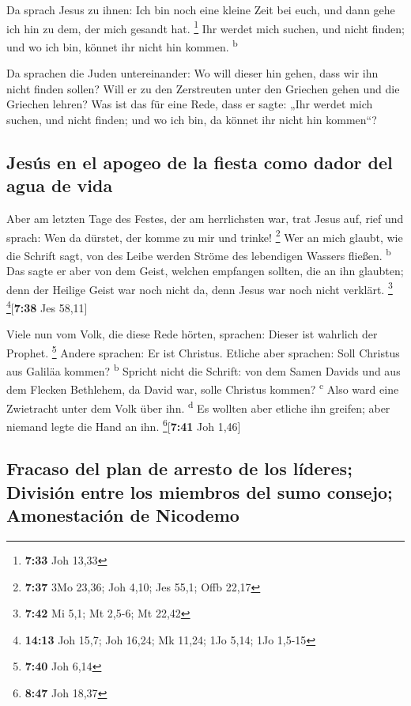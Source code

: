  Da sprach Jesus zu ihnen: Ich bin noch eine kleine Zeit
bei euch, und dann gehe ich hin zu dem, der mich gesandt hat.
\footnote{\textbf{7:33} Joh 13,33}  Ihr werdet mich
suchen, und nicht finden; und wo ich bin, könnet ihr nicht hin kommen.
\textsuperscript{b}

 Da sprachen die Juden untereinander: Wo will dieser hin
gehen, dass wir ihn nicht finden sollen? Will er zu den Zerstreuten
unter den Griechen gehen und die Griechen lehren?  Was
ist das für eine Rede, dass er sagte: „Ihr werdet mich suchen, und nicht
finden; und wo ich bin, da könnet ihr nicht hin kommen``?

\hypertarget{jesuxfas-en-el-apogeo-de-la-fiesta-como-dador-del-agua-de-vida}{%
\subsection{Jesús en el apogeo de la fiesta como dador del agua de
vida}\label{jesuxfas-en-el-apogeo-de-la-fiesta-como-dador-del-agua-de-vida}}

 Aber am letzten Tage des Festes, der am herrlichsten
war, trat Jesus auf, rief und sprach: Wen da dürstet, der komme zu mir
und trinke! \footnote{\textbf{7:37} 3Mo 23,36; Joh 4,10; Jes 55,1; Offb
  22,17}  Wer an mich glaubt, wie die Schrift sagt, von
des Leibe werden Ströme des lebendigen Wassers fließen.
\textsuperscript{b}  Das sagte er aber von dem Geist,
welchen empfangen sollten, die an ihn glaubten; denn der Heilige Geist
war noch nicht da, denn Jesus war noch nicht verklärt. \footnote{\textbf{7:42}
  Mi 5,1; Mt 2,5-6; Mt 22,42} \footnote{\textbf{14:13} Joh 15,7; Joh
  16,24; Mk 11,24; 1Jo 5,14; 1Jo 1,5-15}{[}\textbf{7:38} Jes 58,11{]}

 Viele nun vom Volk, die diese Rede hörten, sprachen:
Dieser ist wahrlich der Prophet. \footnote{\textbf{7:40} Joh 6,14}
 Andere sprachen: Er ist Christus. Etliche aber sprachen:
Soll Christus aus Galiläa kommen? \textsuperscript{b} 
Spricht nicht die Schrift: von dem Samen Davids und aus dem Flecken
Bethlehem, da David war, solle Christus kommen? \textsuperscript{c}
 Also ward eine Zwietracht unter dem Volk über ihn.
\textsuperscript{d}  Es wollten aber etliche ihn greifen;
aber niemand legte die Hand an ihn. \footnote{\textbf{8:47} Joh 18,37}{[}\textbf{7:41}
Joh 1,46{]}

\hypertarget{fracaso-del-plan-de-arresto-de-los-luxedderes-divisiuxf3n-entre-los-miembros-del-sumo-consejo-amonestaciuxf3n-de-nicodemo}{%
\subsection{Fracaso del plan de arresto de los líderes; División entre
los miembros del sumo consejo; Amonestación de
Nicodemo}\label{fracaso-del-plan-de-arresto-de-los-luxedderes-divisiuxf3n-entre-los-miembros-del-sumo-consejo-amonestaciuxf3n-de-nicodemo}}

